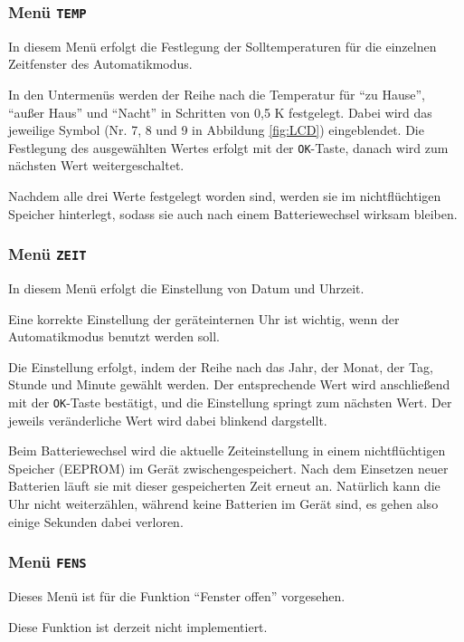 \documentclass[a5paper]{article}
\begin{document}
\subsubsection {
  Menü \texttt{TEMP}\label{menu:temp}
}

In diesem Menü erfolgt die Festlegung der Solltemperaturen für die
einzelnen Zeitfenster des Automatikmodus.

In den Untermenüs werden der Reihe nach die Temperatur für "`zu
Hause"', "`außer Haus"' und "`Nacht"' in Schritten von 0,5 K
festgelegt.  Dabei wird das jeweilige Symbol (Nr. 7, 8 und 9
in Abbildung \ref{fig:LCD}) eingeblendet.  Die Festlegung des
ausgewählten Wertes erfolgt mit der \texttt{OK}-Taste, danach
wird zum nächsten Wert weitergeschaltet.

Nachdem alle drei Werte festgelegt worden sind, werden sie im
nichtflüchtigen Speicher hinterlegt, sodass sie auch nach einem
Batteriewechsel wirksam bleiben.

\subsubsection {
  Menü \texttt{ZEIT}\label{menu:zeit}
}

In diesem Menü erfolgt die Einstellung von Datum und Uhrzeit.

Eine korrekte Einstellung der geräteinternen Uhr ist wichtig, wenn
der Automatikmodus benutzt werden soll.

Die Einstellung erfolgt, indem der Reihe nach das Jahr, der Monat,
der Tag, Stunde und Minute gewählt werden.  Der entsprechende Wert
wird anschließend mit der \texttt{OK}-Taste bestätigt, und die
Einstellung springt zum nächsten Wert.  Der jeweils veränderliche
Wert wird dabei blinkend dargstellt.

Beim Batteriewechsel wird die aktuelle Zeiteinstellung in einem
nichtflüchtigen Speicher (EEPROM) im Gerät zwischengespeichert.  Nach
dem Einsetzen neuer Batterien läuft sie mit dieser gespeicherten Zeit
erneut an.  Natürlich kann die Uhr nicht weiterzählen, während keine
Batterien im Gerät sind, es gehen also einige Sekunden dabei
verloren.

\subsubsection {
  Menü \texttt{FENS}
}

Dieses Menü ist für die Funktion "`Fenster offen"' vorgesehen.

Diese Funktion ist derzeit nicht implementiert.
\end{document}
